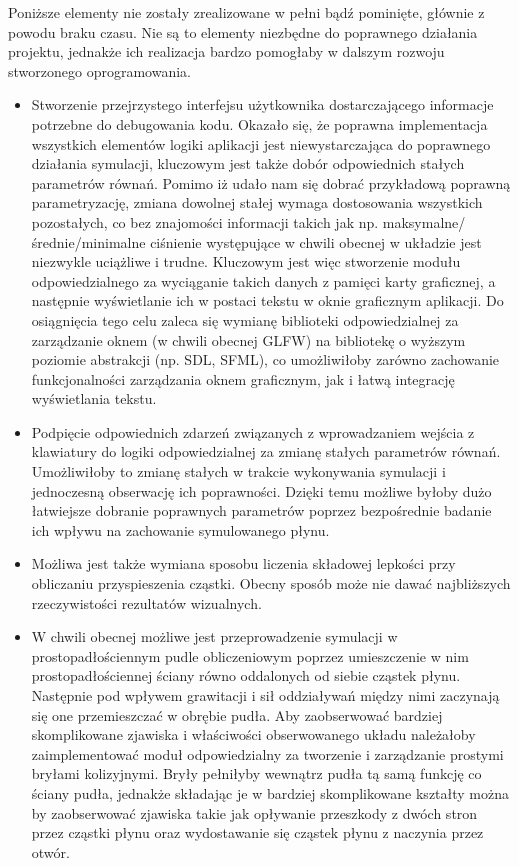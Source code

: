 \documentclass[polish, 12pt]{aghthesis}
\begin{document}
		Poniższe elementy nie zostały zrealizowane w pełni bądź pominięte, głównie z powodu braku czasu. Nie są to elementy niezbędne do poprawnego działania projektu, jednakże ich realizacja bardzo pomogłaby w dalszym rozwoju stworzonego oprogramowania.
		
		\begin{itemize}
		
			\item Stworzenie przejrzystego interfejsu użytkownika dostarczającego informacje potrzebne do debugowania kodu. Okazało się, że poprawna implementacja wszystkich elementów logiki aplikacji jest niewystarczająca do poprawnego działania symulacji, kluczowym jest także dobór odpowiednich stałych parametrów równań. Pomimo iż udało nam się dobrać przykładową poprawną parametryzację, zmiana dowolnej stałej wymaga dostosowania wszystkich pozostałych, co bez znajomości informacji takich jak np. maksymalne/średnie/minimalne ciśnienie występujące w chwili obecnej w układzie jest niezwykle uciążliwe i trudne. Kluczowym jest więc stworzenie modułu odpowiedzialnego za wyciąganie takich danych z pamięci karty graficznej, a następnie wyświetlanie ich w postaci tekstu w oknie graficznym aplikacji. Do osiągnięcia tego celu zaleca się wymianę biblioteki odpowiedzialnej za zarządzanie oknem (w chwili obecnej GLFW) na bibliotekę o wyższym poziomie abstrakcji (np. SDL, SFML), co umożliwiłoby zarówno zachowanie funkcjonalności zarządzania oknem graficznym, jak i łatwą integrację wyświetlania tekstu.
			
			\item Podpięcie odpowiednich zdarzeń związanych z wprowadzaniem wejścia z klawiatury do logiki odpowiedzialnej za zmianę stałych parametrów równań. Umożliwiłoby to zmianę stałych w trakcie wykonywania symulacji i jednoczesną obserwację ich poprawności. Dzięki temu możliwe byłoby dużo łatwiejsze dobranie poprawnych parametrów poprzez bezpośrednie badanie ich wpływu na zachowanie symulowanego płynu.
			
			\item Możliwa jest także wymiana sposobu liczenia składowej lepkości przy obliczaniu przyspieszenia cząstki. Obecny sposób może nie dawać najbliższych rzeczywistości rezultatów wizualnych.
			
			\item W chwili obecnej możliwe jest przeprowadzenie symulacji w prostopadłościennym pudle obliczeniowym poprzez umieszczenie w nim prostopadłościennej ściany równo oddalonych od siebie cząstek płynu. Następnie pod wpływem grawitacji i sił oddziaływań między nimi zaczynają się one przemieszczać w obrębie pudła. Aby zaobserwować bardziej skomplikowane zjawiska i właściwości obserwowanego układu należałoby zaimplementować moduł odpowiedzialny za tworzenie i zarządzanie prostymi bryłami kolizyjnymi. Bryły pełniłyby wewnątrz pudła tą samą funkcję co ściany pudła, jednakże składając je w bardziej skomplikowane kształty można by zaobserwować zjawiska takie jak opływanie przeszkody z dwóch stron przez cząstki płynu oraz wydostawanie się cząstek płynu z naczynia przez otwór.
			

\end{itemize}
\end{document}
